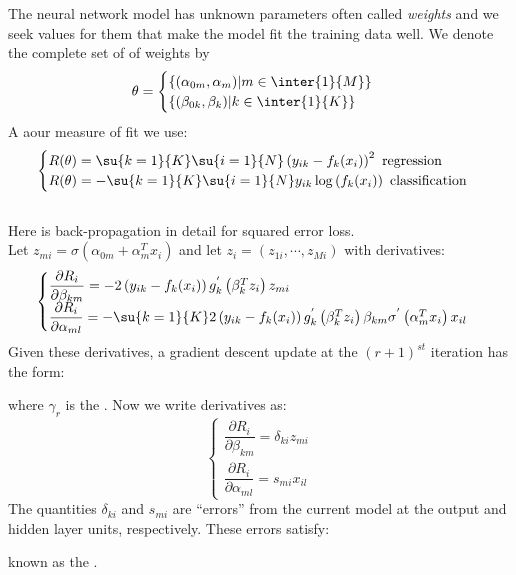 The neural network model has unknown parameters often called \emph{weights} and we seek values
for them that make the model fit the training data well. We denote the complete set of of 
weights by $$\theta=
\begin{cases}
	\left\{(\alpha_{0m},\alpha_{m})|m\in\inter{1}{M}\right\}\\
	\left\{(\beta_{0k},\beta_{k})|k\in\inter{1}{K}\right\}
\end{cases}
$$
A aour measure of fit we use:
$$
\begin{cases}
	R(\theta)=\su{{k=1}}{K}\su{{i=1}}{N}\left(y_{ik}-f_{k}(x_{i})\right)^{2}\text{ 
	regression}\\
	R(\theta)=-\su{{k=1}}{K}\su{{i=1}}{N}y_{ik}\log\left(f_{k}(x_{i})\right)\text{ 
	classification}
\end{cases}
$$
\\
Here is back-propagation in detail for squared error loss.\\
Let $z_{mi}=\sigma(\alpha_{0m}+
\alpha_{m}^{T}x_{i})$ and let $z_{i}=(z_{1i},\cdots,z_{Mi})$
with derivatives:
$$
\begin{cases}
	\dfrac{\partial R_{i}}{\partial\beta_{km}} = -2\left(y_{ik}-f_{k}(x_{i})\right)
	g_{k}^{'}\left(\beta_{k}^{T}z_{i}\right)z_{mi}\\
	\dfrac{\partial R_{i}}{\partial\alpha_{ml}} = -\su{{k=1}}{K}2\left(y_{ik}-f_{k}(x_{i})
	\right)g_{k}^{'}\left(\beta_{k}^{T}z_{i}\right)\beta_{km}\sigma^{'}\left(\alpha_{m}^{T}
	x_{i}\right)x_{il}
\end{cases}
$$
Given these derivatives, a gradient descent update at the $(r+1)^{st}$ iteration has the form:
\begin{center}
\end{center}
where $\gamma_{r}$ is the . Now we write derivatives as:
$$
\begin{cases}
	\dfrac{\partial R_{i}}{\partial\beta_{km}}=\delta_{ki}z_{mi}\\
	\dfrac{\partial R_{i}}{\partial\alpha_{ml}}=s_{mi}x_{il}
\end{cases}
$$
The quantities $\delta_{ki}$ and $s_{mi}$ are ``errors'' from the current model at the output
and hidden layer units, respectively. These errors satisfy:
\begin{center}
\end{center}
known as the .


